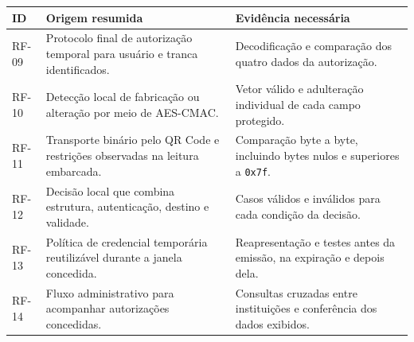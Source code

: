 \begin{quadro}[htb]
    \caption{Rastreabilidade de RF-09 a RF-14: credencial e decisão local}
    \label{qua:rastreabilidade-rf-credencial}
    \small
    \renewcommand{\arraystretch}{1.12}
    \begin{tabular}{|>{\centering\arraybackslash}p{}|>{\raggedright\arraybackslash}p{}|>{\raggedright\arraybackslash}p{}|}
        \hline
        \textbf{ID} & \textbf{Origem resumida} & \textbf{Evidência necessária} \\ \hline
        RF-09 & Protocolo final de autorização temporal para usuário e tranca identificados. & Decodificação e comparação dos quatro dados da autorização. \\ \hline
        RF-10 & Detecção local de fabricação ou alteração por meio de AES-CMAC. & Vetor válido e adulteração individual de cada campo protegido. \\ \hline
        RF-11 & Transporte binário pelo QR Code e restrições observadas na leitura embarcada. & Comparação byte a byte, incluindo bytes nulos e superiores a \texttt{0x7f}. \\ \hline
        RF-12 & Decisão local que combina estrutura, autenticação, destino e validade. & Casos válidos e inválidos para cada condição da decisão. \\ \hline
        RF-13 & Política de credencial temporária reutilizável durante a janela concedida. & Reapresentação e testes antes da emissão, na expiração e depois dela. \\ \hline
        RF-14 & Fluxo administrativo para acompanhar autorizações concedidas. & Consultas cruzadas entre instituições e conferência dos dados exibidos. \\ \hline
    \end{tabular}
\end{quadro}

